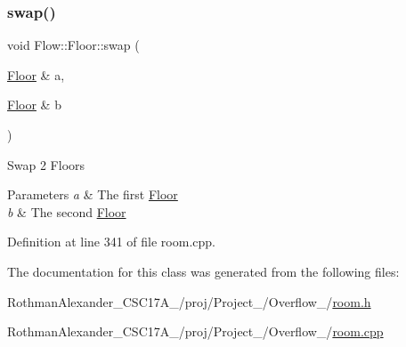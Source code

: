 \hypertarget{class_flow_1_1_floor_a390f2a8e15aa8c4cb50180feda028d5d}{}\label{class_flow_1_1_floor_a390f2a8e15aa8c4cb50180feda028d5d} 
\subsubsection{\texorpdfstring{swap()}{swap()}}
{\footnotesize\ttfamily void Flow\+::\+Floor\+::swap (\begin{DoxyParamCaption}\item[{\hyperlink{class_flow_1_1_floor}{Floor} \&}]{a,  }\item[{\hyperlink{class_flow_1_1_floor}{Floor} \&}]{b }\end{DoxyParamCaption})\hspace{0.3cm}{\ttfamily [static]}}

Swap 2 Floors 
\begin{DoxyParams}{Parameters}
{\em a} & The first \hyperlink{class_flow_1_1_floor}{Floor} \\
\hline
{\em b} & The second \hyperlink{class_flow_1_1_floor}{Floor} \\
\hline
\end{DoxyParams}


Definition at line 341 of file room.\+cpp.



The documentation for this class was generated from the following files\+:\begin{DoxyCompactItemize}
\item 
Rothman\+Alexander\+\_\+\+C\+S\+C17\+A\+\_/proj/\+Project\+\_/\+Overflow\+\_/\hyperlink{room_8h}{room.\+h}\item 
Rothman\+Alexander\+\_\+\+C\+S\+C17\+A\+\_/proj/\+Project\+\_/\+Overflow\+\_/\hyperlink{room_8cpp}{room.\+cpp}\end{DoxyCompactItemize}
